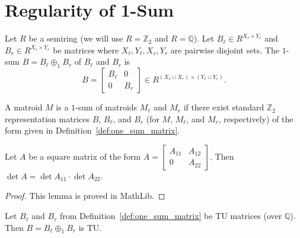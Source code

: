 \chapter{Regularity of 1-Sum}

\begin{definition}\label{def:one_sum_matrix}
    Let $R$ be a semiring (we will use $R = \mathbb{Z}_{2}$ and $R = \mathbb{Q}$). Let $B_{\ell} \in R^{X_{\ell} \times Y_{\ell}}$ and $B_{r} \in R^{X_{r} \times Y_{r}}$ be matrices where $X_{\ell}, Y_{\ell}, X_{r}, Y_{r}$ are pairwise disjoint sets. The $1$-sum $B = B_{\ell} \oplus_{1} B_{r}$ of $B_{\ell}$ and $B_{r}$ is
    \[
        B = \begin{bmatrix} B_{\ell} & 0 \\ 0 & B_{r} \end{bmatrix} \in R^{(X_{\ell} \cup X_{r}) \times (Y_{\ell} \cup Y_{r})}.
    \]
\end{definition}

\begin{definition}\label{def:one_sum_matroid}
    A matroid $M$ is a $1$-sum of matroids $M_{\ell}$ and $M_{r}$ if there exist standard $\mathbb{Z}_{2}$ representation matrices $B$, $B_{\ell}$, and $B_{r}$ (for $M$, $M_{\ell}$, and $M_{r}$, respectively) of the form given in Definition~\ref{def:one_sum_matrix}.
\end{definition}

\begin{lemma}\label{lem:det_lower_left_zero}
    Let $A$ be a square matrix of the form $A = \begin{bmatrix} A_{11} & A_{12} \\ 0 & A_{22} \end{bmatrix}$. Then $\det A = \det A_{11} \cdot \det A_{22}$.
\end{lemma}

\begin{proof}
    This lemma is proved in MathLib.
\end{proof}

\begin{lemma}\label{lem:one_sum_tu}
    Let $B_{\ell}$ and $B_{r}$ from Definition~\ref{def:one_sum_matrix} be TU matrices (over $\mathbb{Q}$). Then $B = B_{\ell} \oplus_{1} B_{r}$ is TU.
\end{lemma}

